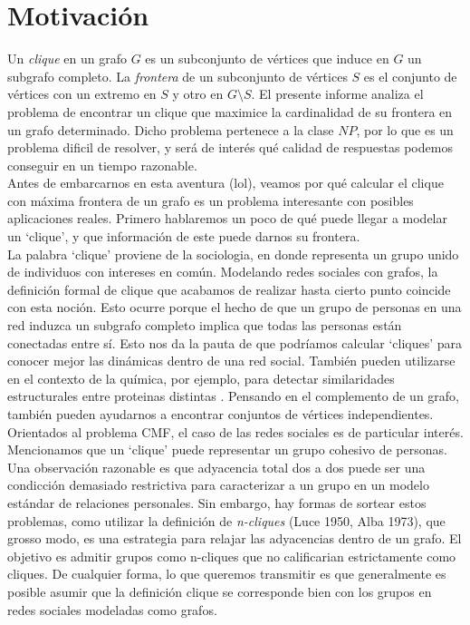 
\section{Motivación}

Un \textit{clique} en un grafo $G$ es un subconjunto de vértices que induce en $G$ un subgrafo completo. La \textit{frontera} de un subconjunto de vértices $S$ es el conjunto de vértices con un extremo en $S$ y otro en $G \setminus S$. El presente informe analiza el problema de encontrar un clique que maximice la cardinalidad de su frontera en un grafo determinado. Dicho problema pertenece a la clase $NP$, por lo que es un problema dificil de resolver, y será de interés qué calidad de respuestas podemos conseguir en un tiempo razonable. \\

Antes de embarcarnos en esta aventura (lol), veamos por qué calcular el clique con máxima frontera de un grafo es un problema interesante con posibles aplicaciones reales. Primero hablaremos un poco de qué puede llegar a modelar un `clique', y que información de este puede darnos su frontera. \\

La palabra `clique' proviene de la sociologia, en donde representa un grupo unido de individuos con intereses en común. Modelando redes sociales con grafos, la definición formal de clique que acabamos de realizar hasta cierto punto coincide con esta noción. Esto ocurre porque el hecho de que un grupo de personas en una red induzca un subgrafo completo implica que todas las personas están conectadas entre sí. Esto nos da la pauta de que podríamos calcular `cliques' para conocer mejor las dinámicas dentro de una red social. También pueden utilizarse en el contexto de la química, por ejemplo, para detectar similaridades estructurales entre proteinas distintas \cite{proteins}. Pensando en el complemento de un grafo, también pueden ayudarnos a encontrar conjuntos de vértices independientes. \\

Orientados al problema CMF, el caso de las redes sociales es de particular interés. Mencionamos que un `clique' puede representar un grupo cohesivo de personas. Una observación razonable es que adyacencia total dos a dos puede ser una condicción demasiado restrictiva para caracterizar a un grupo en un modelo estándar de relaciones personales. Sin embargo, hay formas de sortear estos problemas, como utilizar la definición de \textit{n-cliques} (Luce 1950, Alba 1973), que grosso modo, es una estrategia para relajar las adyacencias dentro de un grafo. El objetivo es admitir grupos como n-cliques que no calificarian estrictamente como cliques. De cualquier forma, lo que queremos transmitir es que generalmente es posible asumir que la definición clique se corresponde bien con los grupos en redes sociales modeladas como grafos. \\

